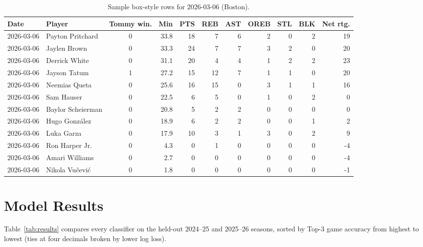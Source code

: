 \documentclass[11pt]{article}
\begin{document}
\begin{table}[H]
    \centering
    \caption{Sample box-style rows for 2026-03-06 (Boston).}
    \label{tab:sample-game-mar6-2026}
    \renewcommand{\arraystretch}{1.15}
    \small
    \setlength{\tabcolsep}{4pt}
    \begin{tabular}{@{}llcrrrrrrrr@{}}
        \toprule
        \textbf{Date} & \textbf{Player} & \textbf{Tommy win.} & \textbf{Min} & \textbf{PTS} & \textbf{REB} & \textbf{AST} & \textbf{OREB} & \textbf{STL} & \textbf{BLK} & \textbf{Net rtg.} \\
        \midrule
        2026-03-06 & Payton Pritchard     & 0 & 33.8 & 18 &  7 & 6 & 2 & 0 & 2 & 19 \\
        2026-03-06 & Jaylen Brown         & 0 & 33.3 & 24 &  7 & 7 & 3 & 2 & 0 & 20 \\
        2026-03-06 & Derrick White        & 0 & 31.1 & 20 &  4 & 4 & 1 & 2 & 2 & 23 \\
        2026-03-06 & Jayson Tatum         & 1 & 27.2 & 15 & 12 & 7 & 1 & 1 & 0 & 20 \\
        2026-03-06 & Neemias Queta        & 0 & 25.6 & 16 & 15 & 0 & 3 & 1 & 1 & 16 \\
        2026-03-06 & Sam Hauser           & 0 & 22.5 &  6 &  5 & 0 & 1 & 0 & 2 &  0 \\
        2026-03-06 & Baylor Scheierman    & 0 & 20.8 &  5 &  2 & 2 & 0 & 0 & 0 &  0 \\
        2026-03-06 & Hugo Gonz\'alez      & 0 & 18.9 &  6 &  2 & 2 & 0 & 0 & 1 &  2 \\
        2026-03-06 & Luka Garza           & 0 & 17.9 & 10 &  3 & 1 & 3 & 0 & 2 &  9 \\
        2026-03-06 & Ron Harper Jr.       & 0 &  4.3 &  0 &  1 & 0 & 0 & 0 & 0 & -4 \\
        2026-03-06 & Amari Williams       & 0 &  2.7 &  0 &  0 & 0 & 0 & 0 & 0 & -4 \\
        2026-03-06 & Nikola Vu\v{c}evi\'c & 0 &  1.8 &  0 &  0 & 0 & 0 & 0 & 0 & -1 \\
        \bottomrule
    \end{tabular}
\end{table}

\section{Model Results}
Table~\ref{tab:results} compares every classifier on the held-out
2024--25 and 2025--26 seasons, sorted by Top-3 game accuracy from
highest to lowest (ties at four decimals broken by lower log loss).
\end{document}
